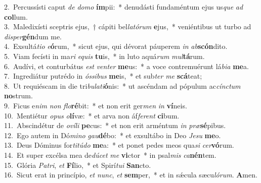 {2.~}Percussísti caput \textit{de} \textit{do}\textit{mo} \textbf{ím}pii:~* denudásti fundaméntum ejus us\textit{que} \textit{ad} \textbf{col}lum.\\
{3.~}Maledixísti sceptris ejus,~† cápiti bel\textit{la}\textit{tó}\textit{rum} \textbf{e}jus,~* veniéntibus ut turbo ad \textit{di}\textit{sper}\textbf{gén}dum me.\\
{4.~}Exsultá\textit{ti}\textit{o} \textit{e}\textbf{ó}rum,~* sicut ejus, qui dévorat páuperem \textit{in} \textit{ab}\textbf{scón}dito.\\
{5.~}Viam fecísti in ma\textit{ri} \textit{e}\textit{quis} \textbf{tu}is,~* in luto aquá\textit{rum} \textit{mul}\textbf{tá}rum.\\
{6.~}Audívi, et conturbátus \textit{est} \textit{ven}\textit{ter} \textbf{me}us:~* a voce contremuérunt lá\textit{bi}\textit{a} \textbf{me}a.\\
{7.~}Ingrediátur putrédo in \textit{ós}\textit{si}\textit{bus} \textbf{me}is,~* et sub\textit{ter} \textit{me} \textbf{scá}teat;\\
{8.~}Ut requiéscam in die tri\textit{bu}\textit{la}\textit{ti}\textbf{ó}nis:~* ut ascéndam ad pópulum ac\textit{cín}\textit{ctum} \textbf{no}strum.\\
{9.~}Ficus e\textit{nim} \textit{non} \textit{flo}\textbf{ré}bit:~* et non erit ger\textit{men} \textit{in} \textbf{ví}neis.\\
{10.~}Mentiétur \textit{o}\textit{pus} \textit{o}\textbf{lí}væ:~* et arva non áf\textit{fe}\textit{rent} \textbf{ci}bum.\\
{11.~}Abscindétur de \textit{o}\textit{ví}\textit{li} \textbf{pe}cus:~* et non erit arméntum \textit{in} \textit{præ}\textbf{sé}pibus.\\
{12.~}Ego autem in Dó\textit{mi}\textit{no} \textit{gau}\textbf{dé}bo:~* et exsultábo in Deo \textit{Je}\textit{su} \textbf{me}o.\\
{13.~}Deus Dóminus for\textit{ti}\textit{tú}\textit{do} \textbf{me}a:~* et ponet pedes meos qua\textit{si} \textit{cer}\textbf{vó}rum.\\
{14.~}Et super excélsa mea de\textit{dú}\textit{cet} \textit{me} \textbf{vi}ctor~* in psal\textit{mis} \textit{ca}\textbf{nén}tem.\\
{15.~}Glória \textit{Pa}\textit{tri}, \textit{et} \textbf{Fí}lio,~* et Spirí\textit{tu}\textit{i} \textbf{San}cto.\\
{16.~}Sicut erat in princípio, \textit{et} \textit{nunc}, \textit{et} \textbf{sem}per,~* et in sǽcula sæcu\textit{ló}\textit{rum}. \textbf{A}men.\\
